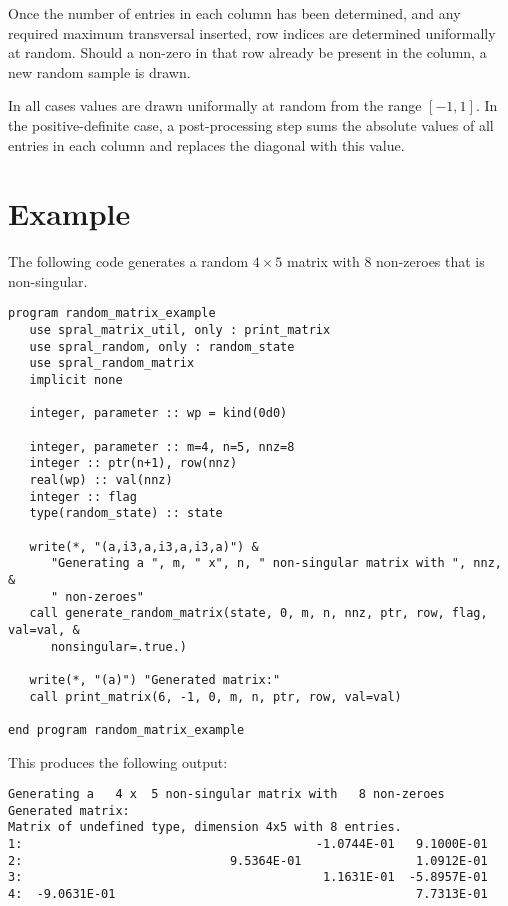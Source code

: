 Once the number of entries in each column has been determined, and any required
maximum transversal inserted, row indices are determined uniformally at random.
Should a non-zero in that row already be present in the column, a new random
sample is drawn.

In all cases values are drawn uniformally at random from the range $[-1,1]$. In
the positive-definite case, a post-processing step sums the absolute values of
all entries in each column and replaces the diagonal with this value.


\section{Example} \label{examples}

The following code generates a random $4 \times 5$ matrix with $8$ non-zeroes
that is non-singular.
\begin{verbatim}
program random_matrix_example
   use spral_matrix_util, only : print_matrix
   use spral_random, only : random_state
   use spral_random_matrix
   implicit none

   integer, parameter :: wp = kind(0d0)

   integer, parameter :: m=4, n=5, nnz=8
   integer :: ptr(n+1), row(nnz)
   real(wp) :: val(nnz)
   integer :: flag
   type(random_state) :: state

   write(*, "(a,i3,a,i3,a,i3,a)") &
      "Generating a ", m, " x", n, " non-singular matrix with ", nnz, &
      " non-zeroes"
   call generate_random_matrix(state, 0, m, n, nnz, ptr, row, flag, val=val, &
      nonsingular=.true.)

   write(*, "(a)") "Generated matrix:"
   call print_matrix(6, -1, 0, m, n, ptr, row, val=val)

end program random_matrix_example
\end{verbatim}

This produces the following output:
\begin{verbatim}
Generating a   4 x  5 non-singular matrix with   8 non-zeroes
Generated matrix:
Matrix of undefined type, dimension 4x5 with 8 entries.
1:                                         -1.0744E-01   9.1000E-01
2:                             9.5364E-01                1.0912E-01
3:                                          1.1631E-01  -5.8957E-01
4:  -9.0631E-01                                          7.7313E-01
\end{verbatim}

\begin{funders}
\end{funders}
